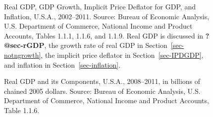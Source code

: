 \documentclass[
  letterpaper,
]{book}
\begin{document}
\begin{figure}


\caption{\label{fig-growth-inflation}Real GDP, GDP Growth, Implicit
Price Deflator for GDP, and Inflation, U.S.A., 2002--2011. Source:
Bureau of Economic Analysis, U.S. Department of Commerce, National
Income and Product Accounts, Tables 1.1.1, 1.1.6, and 1.1.9. Real GDP is
discussed in \textbf{?@sec-rGDP}, the growth rate of real GDP in
Section~\ref{sec-notngrowth}, the implicit price deflator in
Section~\ref{sec-IPDGDP}, and inflation in Section~\ref{sec-inflation}.}

\end{figure}%

\begin{figure}


\caption{\label{fig-gdp-components}Real GDP and its Components, U.S.A.,
2008--2011, in billions of chained 2005 dollars. Source: Bureau of
Economic Analysis, U.S. Department of Commerce, National Income and
Product Accounts, Table 1.1.6.}

\end{figure}%
\end{document}
